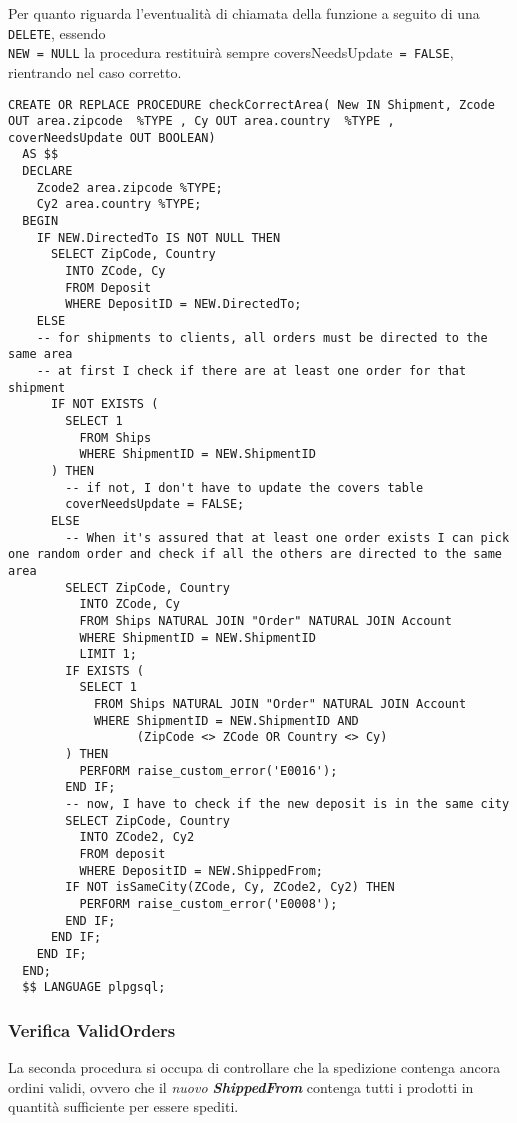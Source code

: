Per quanto riguarda l'eventualità di chiamata della funzione a seguito di una \lstinline{DELETE}, essendo \\
\lstinline{NEW = NULL} la procedura restituirà sempre {\FiraCode\fontsize{10pt}{11pt}\selectfont coversNeedsUpdate}\lstinline{ = FALSE}, rientrando nel caso corretto.
\newpage
\begin{lstlisting}[caption={Procedure \textbf{checkCorrectArea}}]
  CREATE OR REPLACE PROCEDURE checkCorrectArea( New IN Shipment, Zcode OUT area.zipcode  %TYPE , Cy OUT area.country  %TYPE , coverNeedsUpdate OUT BOOLEAN)
  AS $$
  DECLARE
    Zcode2 area.zipcode %TYPE;
    Cy2 area.country %TYPE;
  BEGIN 
    IF NEW.DirectedTo IS NOT NULL THEN
      SELECT ZipCode, Country 
        INTO ZCode, Cy
        FROM Deposit
        WHERE DepositID = NEW.DirectedTo;
    ELSE
    -- for shipments to clients, all orders must be directed to the same area
    -- at first I check if there are at least one order for that shipment
      IF NOT EXISTS (
        SELECT 1
          FROM Ships 
          WHERE ShipmentID = NEW.ShipmentID
      ) THEN
        -- if not, I don't have to update the covers table
        coverNeedsUpdate = FALSE;
      ELSE
        -- When it's assured that at least one order exists I can pick one random order and check if all the others are directed to the same area
        SELECT ZipCode, Country 
          INTO ZCode, Cy
          FROM Ships NATURAL JOIN "Order" NATURAL JOIN Account
          WHERE ShipmentID = NEW.ShipmentID
          LIMIT 1;
        IF EXISTS (
          SELECT 1
            FROM Ships NATURAL JOIN "Order" NATURAL JOIN Account
            WHERE ShipmentID = NEW.ShipmentID AND
                  (ZipCode <> ZCode OR Country <> Cy)
        ) THEN
          PERFORM raise_custom_error('E0016');
        END IF;
        -- now, I have to check if the new deposit is in the same city
        SELECT ZipCode, Country 
          INTO ZCode2, Cy2
          FROM deposit
          WHERE DepositID = NEW.ShippedFrom;
        IF NOT isSameCity(ZCode, Cy, ZCode2, Cy2) THEN
          PERFORM raise_custom_error('E0008');
        END IF;
      END IF;
    END IF;
  END;
  $$ LANGUAGE plpgsql;
\end{lstlisting}

\subsubsection{Verifica ValidOrders}

La seconda procedura si occupa di controllare che la spedizione contenga ancora ordini validi, ovvero che il \textit{nuovo \textbf{ShippedFrom}} contenga tutti i prodotti in quantità sufficiente per essere spediti.


